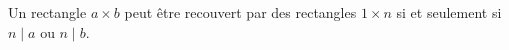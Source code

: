 Un rectangle $a \times b$ peut être recouvert par des rectangles $1 \times n$ si et seulement si $n \mid a$ ou $n \mid b$.
